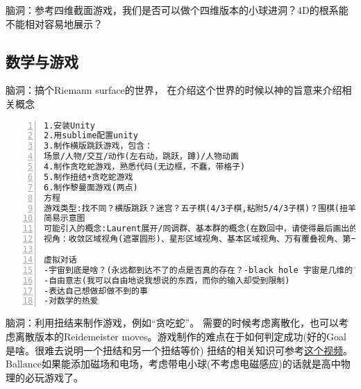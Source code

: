 \documentclass[11pt]{amsart}
\begin{document}
脑洞：参考四维截面游戏，我们是否可以做个四维版本的小球进洞？4D的根系能不能相对容易地展示？

\subsection{数学与游戏}


脑洞：搞个Riemann surface的世界， 在介绍这个世界的时候以神的旨意来介绍相关概念
\begin{lstlisting}[numbers=left,numberstyle=\tiny,numbersep=10pt]
1.安装Unity
2.用sublime配置unity
3.制作横版跳跃游戏，包含：
场景/人物/交互/动作(左右动，跳跃，蹲)/人物动画
4.制作贪吃蛇游戏，熟悉代码(无边框，不蠢，带格子)
5.制作扭结+贪吃蛇游戏
6.制作黎曼面游戏(两点)
方程
游戏类型:找不同？横版跳跃？迷宫？五子棋(4/3子棋,粘附5/4/3子棋)？围棋(扭羊头游戏)?跳棋？空间爬行？扭结+贪吃蛇？塔防？数独？数回？华容道？ORBOX B?(这玩意可以做成三维版本!4维就有点难了)(mini metro？连连看？泡泡龙？消砖块？2048？推箱子？其他的Nikoli Puzzles？)
简易示意图
可能引入的概念:Laurent展开/同调群、基本群的概念(在数回中，请使得最后画出的曲线表示基本群不平凡但是同调群不平凡)/覆叠，万有覆叠，deck transformation(华容道简化难度:允许deck transformation将区块变换至另一个基本区域中相同的位置；或者，我们允许上下粘接)/曲率/曲率驱动游戏/descent(数独解何时能成为更小的黎曼面的解)
视角：收敛区域视角(遮罩圆形)、星形区域视角、基本区域视角、万有覆叠视角、第一人称视角、二维3D视角(视角需要通过"培训+考试"解锁)

虚拟对话
-宇宙到底是啥？(永远都到达不了的点是否真的存在？-black hole 宇宙是几维的？2+3(颜色)+1(时间) 如何测量时间，or时间的流逝是否是均匀的？)
-自由意志(我可以自由地说我想说的东西，而你的输入却受到限制)
-表达自己想做却做不到的事
-对数学的热爱

\end{lstlisting}

脑洞：利用扭结来制作游戏，例如“贪吃蛇”。 需要的时候考虑离散化，也可以考虑离散版本的Reidemeister moves。游戏制作的难点在于如何判定成功(好的Goal是啥。很难去说明一个扭结和另一个扭结等价)
扭结的相关知识可参考\href{https://www.youtube.com/watch?v=nYz3pRk1cCA}{这个视频}。Ballance如果能添加磁场和电场，考虑带电小球(不考虑电磁感应)的话就是高中物理的必玩游戏了。
\end{document}
